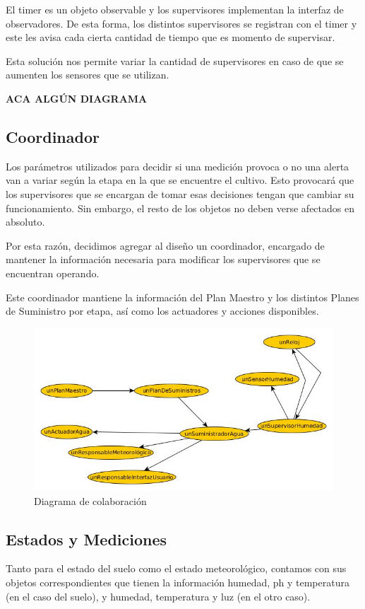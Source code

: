 El timer es un objeto observable y los supervisores implementan la interfaz de observadores. De esta forma, los distintos supervisores se registran con el timer y este les avisa cada cierta cantidad de tiempo que es momento de supervisar.

Esta solución nos permite variar la cantidad de supervisores en caso de que se aumenten los sensores que se utilizan.

\textbf{ACA ALGÚN DIAGRAMA}

\subsection{Coordinador}
Los parámetros utilizados para decidir si una medición provoca o no una alerta van a variar según la etapa en la que se encuentre el cultivo. Esto provocará que los supervisores que se encargan de tomar esas decisiones tengan que cambiar su funcionamiento. Sin embargo, el resto de los objetos no deben verse afectados en absoluto.

Por esta razón, decidimos agregar al diseño un coordinador, encargado de mantener la información necesaria para modificar los supervisores que se encuentran operando. 

Este coordinador mantiene la información del Plan Maestro y los distintos Planes de Suministro por etapa, así como los actuadores y acciones disponibles.

\begin{figure}[h!]
  \centering
  \includegraphics[width=1\textwidth]{./imagenes/objetosCoordinador.jpg}
  \caption{Diagrama de colaboración}
  \label{fig:sec_sum1}
\end{figure}


\subsection{Estados y Mediciones}
Tanto para el estado del suelo como el estado meteorológico, contamos con sus objetos correspondientes que tienen la información humedad, ph y temperatura (en el caso del suelo), y humedad, temperatura y luz (en el otro caso).


